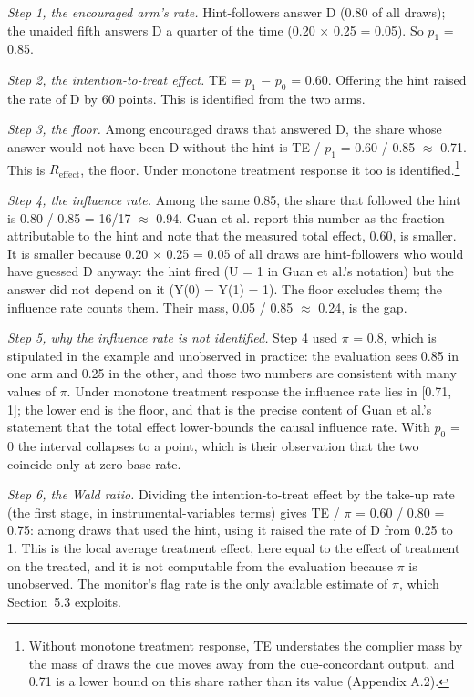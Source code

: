 \documentclass[11pt,a4paper]{article}
\begin{document}

\emph{Step 1, the encouraged arm’s rate.} Hint-followers answer D (0.80 of all draws); the unaided fifth answers D a quarter of the time (0.20 $\times$ 0.25 = 0.05). So $p_1$ = 0.85.

\emph{Step 2, the intention-to-treat effect.} TE = $p_1$ $-$ $p_0$ = 0.60. Offering the hint raised the rate of D by 60 points. This is identified from the two arms.

\emph{Step 3, the floor.} Among encouraged draws that answered D, the share whose answer would not have been D without the hint is TE / $p_1$ = 0.60 / 0.85 $\approx$ 0.71. This is $R_{\mathrm{effect}}$, the floor. Under monotone treatment response it too is identified.\footnote{Without monotone treatment response, TE understates the complier mass by the mass of draws the cue moves away from the cue-concordant output, and 0.71 is a lower bound on this share rather than its value (Appendix A.2).}

\emph{Step 4, the influence rate.} Among the same 0.85, the share that followed the hint is 0.80 / 0.85 = 16/17 $\approx$ 0.94. Guan et al. report this number as the fraction attributable to the hint and note that the measured total effect, 0.60, is smaller. It is smaller because 0.20 $\times$ 0.25 = 0.05 of all draws are hint-followers who would have guessed D anyway: the hint fired (U = 1 in Guan et al.’s notation) but the answer did not depend on it (Y(0) = Y(1) = 1). The floor excludes them; the influence rate counts them. Their mass, 0.05 / 0.85 $\approx$ 0.24, is the gap.

\emph{Step 5, why the influence rate is not identified.} Step 4 used $\pi$ = 0.8, which is stipulated in the example and unobserved in practice: the evaluation sees 0.85 in one arm and 0.25 in the other, and those two numbers are consistent with many values of $\pi$. Under monotone treatment response the influence rate lies in [0.71, 1]; the lower end is the floor, and that is the precise content of Guan et al.’s statement that the total effect lower-bounds the causal influence rate. With $p_0$ = 0 the interval collapses to a point, which is their observation that the two coincide only at zero base rate.

\emph{Step 6, the Wald ratio.} Dividing the intention-to-treat effect by the take-up rate (the first stage, in instrumental-variables terms) gives TE / $\pi$ = 0.60 / 0.80 = 0.75: among draws that used the hint, using it raised the rate of D from 0.25 to 1. This is the local average treatment effect, here equal to the effect of treatment on the treated, and it is not computable from the evaluation because $\pi$ is unobserved. The monitor’s flag rate is the only available estimate of $\pi$, which Section~5.3 exploits.
\end{document}
